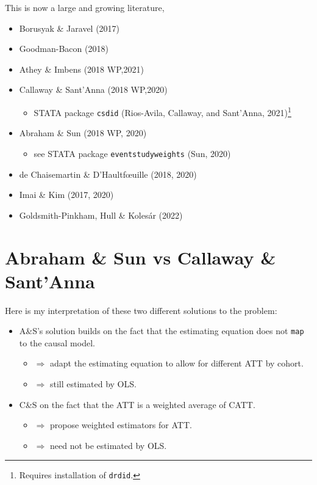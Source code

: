 \documentclass[
  letterpaper,
  DIV=11,
  numbers=noendperiod]{scrreprt}
\providecommand{\tightlist}{%
  \setlength{\itemsep}{0pt}\setlength{\parskip}{0pt}}\usepackage{longtable,booktabs,array}
\theoremstyle{definition}
\theoremstyle{remark}
\begin{document}
This is now a large and growing literature,

\begin{itemize}
\tightlist
\item
  Borusyak \& Jaravel (2017)
\item
  Goodman-Bacon (2018)
\item
  Athey \& Imbens (2018 WP,2021)
\item
  Callaway \& Sant'Anna (2018 WP,2020)

  \begin{itemize}
  \tightlist
  \item
    STATA package \texttt{csdid} (Rios-Avila, Callaway, and Sant'Anna,
    2021)\footnote{Requires installation of \texttt{drdid}.}
  \end{itemize}
\item
  Abraham \& Sun (2018 WP, 2020)

  \begin{itemize}
  \tightlist
  \item
    see STATA package \texttt{eventstudyweights} (Sun, 2020)
  \end{itemize}
\item
  de Chaisemartin \& D'Haultfœuille (2018, 2020)
\item
  Imai \& Kim (2017, 2020)
\item
  Goldsmith-Pinkham, Hull \& Kolesár (2022)
\end{itemize}

\section{Abraham \& Sun vs Callaway \&
Sant'Anna}\label{abraham-sun-vs-callaway-santanna}

Here is my interpretation of these two different solutions to the
problem:

\begin{itemize}
\tightlist
\item
  A\&S's solution builds on the fact that the estimating equation does
  not \texttt{map} to the causal model.

  \begin{itemize}
  \tightlist
  \item
    \(\Rightarrow\) adapt the estimating equation to allow for different
    ATT by cohort.
  \item
    \(\Rightarrow\) still estimated by OLS.
  \end{itemize}
\item
  C\&S on the fact that the ATT is a weighted average of CATT.

  \begin{itemize}
  \tightlist
  \item
    \(\Rightarrow\) propose weighted estimators for ATT.
  \item
    \(\Rightarrow\) need not be estimated by OLS.
  \end{itemize}
\end{itemize}
\end{document}
